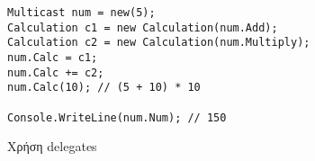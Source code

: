 \begin{listing}[htbp]
\begin{verbatim}
Multicast num = new(5);
Calculation c1 = new Calculation(num.Add);
Calculation c2 = new Calculation(num.Multiply);
num.Calc = c1;
num.Calc += c2;
num.Calc(10); // (5 + 10) * 10

Console.WriteLine(num.Num); // 150
\end{verbatim}
\caption{Χρήση delegates}
\label{multicastExec}
\end{listing}